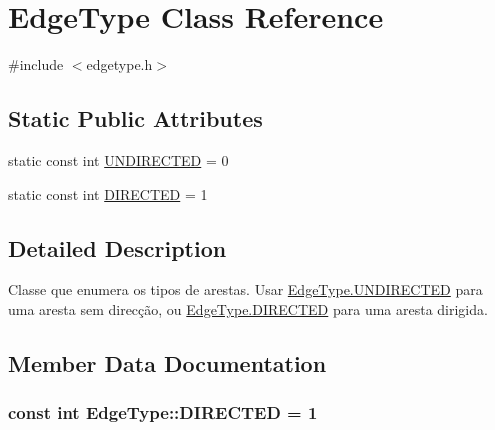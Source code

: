 \hypertarget{classEdgeType}{}\section{Edge\+Type Class Reference}
\label{classEdgeType}


{\ttfamily \#include $<$edgetype.\+h$>$}

\subsection*{Static Public Attributes}
\begin{DoxyCompactItemize}
\item 
static const int \hyperlink{classEdgeType_a6533cc56d05c288a550b9980b66c9317}{U\+N\+D\+I\+R\+E\+C\+T\+ED} = 0
\item 
static const int \hyperlink{classEdgeType_a903017a534f2818c2d17145e4ae0321c}{D\+I\+R\+E\+C\+T\+ED} = 1
\end{DoxyCompactItemize}


\subsection{Detailed Description}
Classe que enumera os tipos de arestas. Usar \hyperlink{classEdgeType_a6533cc56d05c288a550b9980b66c9317}{Edge\+Type.\+U\+N\+D\+I\+R\+E\+C\+T\+ED} para uma aresta sem direcção, ou \hyperlink{classEdgeType_a903017a534f2818c2d17145e4ae0321c}{Edge\+Type.\+D\+I\+R\+E\+C\+T\+ED} para uma aresta dirigida. 

\subsection{Member Data Documentation}
\subsubsection[{\texorpdfstring{D\+I\+R\+E\+C\+T\+ED}{DIRECTED}}]{\setlength{\rightskip}{0pt plus 5cm}const int Edge\+Type\+::\+D\+I\+R\+E\+C\+T\+ED = 1\hspace{0.3cm}{\ttfamily [static]}}\hypertarget{classEdgeType_a903017a534f2818c2d17145e4ae0321c}{}\label{classEdgeType_a903017a534f2818c2d17145e4ae0321c}
